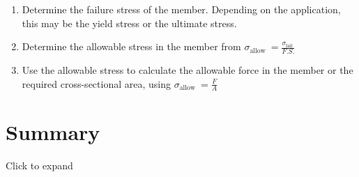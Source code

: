 \documentclass[
  letterpaper,
  DIV=11,
  numbers=noendperiod]{scrreprt}
\providecommand{\tightlist}{%
  \setlength{\itemsep}{0pt}\setlength{\parskip}{0pt}}\usepackage{longtable,booktabs,array}
\begin{document}
\begin{tcolorbox}[enhanced jigsaw, breakable, opacityback=0, toptitle=1mm, left=2mm, colback=white, opacitybacktitle=0.6, colframe=quarto-callout-warning-color-frame, titlerule=0mm, arc=.35mm, leftrule=.75mm, bottomtitle=1mm, colbacktitle=quarto-callout-warning-color!10!white, rightrule=.15mm, title={Step-by-step: Safety factor}, bottomrule=.15mm, toprule=.15mm, coltitle=black]

\begin{enumerate}
\def\labelenumi{\arabic{enumi}.}
\tightlist
\item
  Determine the failure stress of the member. Depending on the
  application, this may be the yield stress or the ultimate stress.
\item
  Determine the allowable stress in the member from
  \(\sigma_{\text {allow }}=\frac{\sigma_{\text {fail }}}{F . S .}\)
\item
  Use the allowable stress to calculate the allowable force in the
  member or the required cross-sectional area, using
  \(\sigma_{\text {allow }}=\frac{F}{A}\)
\end{enumerate}

\end{tcolorbox}

\section*{Summary}\label{summary-3}


Click to expand
\end{document}
